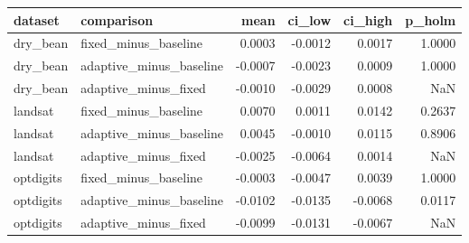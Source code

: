 \begin{tabular}{llrrrr}
\toprule
dataset & comparison & mean & ci\_low & ci\_high & p\_holm \\
\midrule
dry\_bean & fixed\_minus\_baseline & 0.0003 & -0.0012 & 0.0017 & 1.0000 \\
dry\_bean & adaptive\_minus\_baseline & -0.0007 & -0.0023 & 0.0009 & 1.0000 \\
dry\_bean & adaptive\_minus\_fixed & -0.0010 & -0.0029 & 0.0008 & NaN \\
landsat & fixed\_minus\_baseline & 0.0070 & 0.0011 & 0.0142 & 0.2637 \\
landsat & adaptive\_minus\_baseline & 0.0045 & -0.0010 & 0.0115 & 0.8906 \\
landsat & adaptive\_minus\_fixed & -0.0025 & -0.0064 & 0.0014 & NaN \\
optdigits & fixed\_minus\_baseline & -0.0003 & -0.0047 & 0.0039 & 1.0000 \\
optdigits & adaptive\_minus\_baseline & -0.0102 & -0.0135 & -0.0068 & 0.0117 \\
optdigits & adaptive\_minus\_fixed & -0.0099 & -0.0131 & -0.0067 & NaN \\
\bottomrule
\end{tabular}
